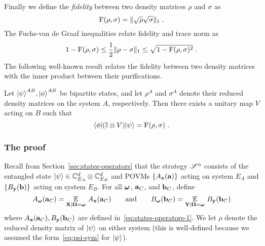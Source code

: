 Finally we define the \emph{fidelity} between two density matrices $\rho$ and $\sigma$ as 
\[\mathrm{F}(\rho,\sigma) = \| \sqrt{\rho} \sqrt{\sigma} \|_1\;.\]
The Fuchs-van de Graaf inequalities relate fidelity and trace norm as
\begin{equation}\label{eq:fuchs-graaf}
1 - \mathrm{F}(\rho,\sigma) \leq \frac{1}{2} \| \rho - \sigma \|_1 \leq \sqrt{1 - \mathrm{F}(\rho,\sigma)^2}\;.
\end{equation}
The following well-known result relates the fidelity between two density matrices with the inner product between their purifications. %

\begin{theorem}
\label{thm:uhlmann}
	Let ${|\psi\rangle}^{AB},{|\phi\rangle}^{AB}$ be bipartite states, and let $\rho^{A}$ and $\sigma^{A}$ denote their reduced density matrices on the system $A$, respectively. Then there exists a unitary map $V$ acting on $B$ such that
	\[
		{\langle\phi|} (\mathbb{I} \otimes V) {|\psi\rangle} = \mathrm{F}(\rho,\sigma)~.
	\]
\end{theorem}



\subsubsection{The proof}

Recall from Section~\ref{sec:states-operators} that the strategy $\mathscr{S}^n$ consists of the entangled state ${|\psi\rangle} \in \mathbb{C}^d_{E_A} \otimes \mathbb{C}^d_{E_B}$ and POVMs $\{A_{\mathbf{x}}(\mathbf{a}) \}$ acting on system $E_A$ and $\{B_{\mathbf{y}}(\mathbf{b}) \}$ acting on system $E_B$. For all ${\boldsymbol{\omega}}$, $\mathbf{a}_C$, and $\mathbf{b}_C$, define
\begin{equation}
\label{eq:a-bomega-def}
	A_{\boldsymbol{\omega}}(\mathbf{a}_C) = \operatorname*{\mathbb{E}}_{\mathbf{X} | {\boldsymbol{\Omega}} = {\boldsymbol{\omega}}} \, A_{\mathbf{x}}(\mathbf{a}_C) \qquad \text{and} \qquad B_{\boldsymbol{\omega}}(\mathbf{b}_C) = \operatorname*{\mathbb{E}}_{\mathbf{Y} | {\boldsymbol{\Omega}} = {\boldsymbol{\omega}}} \, B_{\mathbf{y}}(\mathbf{b}_C)
\end{equation}
where $A_{\mathbf{x}}(\mathbf{a}_C),B_{\mathbf{y}}(\mathbf{b}_C)$ are defined in~\cref{eq:states-operators-1}. 
We let $\rho$ denote the reduced density matrix of ${|\psi\rangle}$ on either system (this is well-defined because we assumed the form~\eqref{eq:psi-sym} for ${|\psi\rangle}$). 

